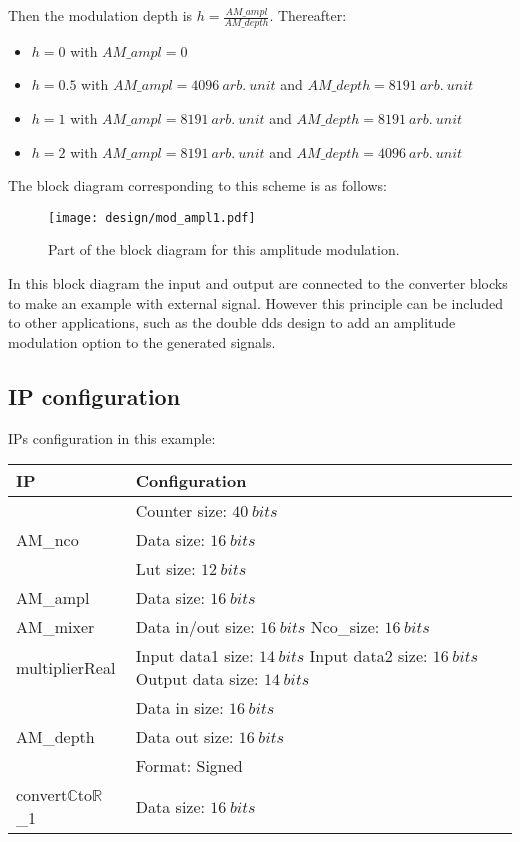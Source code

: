 \documentclass[12pt,oneside]{article}
\begin{document}
Then the modulation depth is $h=\frac{AM\_ampl}{AM\_depth}$. Thereafter:
\vspace{-0.1cm}
\begin{itemize}
	\setlength\itemsep{-0.2cm}
	\item $h=0$ with $AM\_ampl=0$ 
	\item $h=0.5$ with $AM\_ampl=4096~arb.~unit$ and $AM\_depth=8191~arb.~unit$
	\item $h=1$ with $AM\_ampl=8191~arb.~unit$ and $AM\_depth=8191~arb.~unit$
	\item $h=2$ with $AM\_ampl=8191~arb.~unit$ and $AM\_depth=4096~arb.~unit$
\end{itemize}The block diagram corresponding to this scheme is as follows:\newpage

\begin{figure}[h!tb]
	\begin{center}
		\texttt{[image: design/mod\_ampl1.pdf]}
		\caption{Part of the block diagram for this amplitude modulation.}
		\label{fig:mod_ampl1}
	\end{center}
\end{figure}

In this block diagram the input and output are connected to the converter blocks to make an example with external signal. However this principle can be included to other applications, such as the double dds design to add an amplitude modulation option to the generated signals.
\vspace{-0.3cm}
\subsection{IP configuration}
\vspace{-0cm}
IPs configuration in this example:
\begin{center}
	\begin{tabular}{|>{\centering\arraybackslash}m{.3\linewidth} | >{\centering\arraybackslash}m{.3\linewidth} |}
		\hline
		IP & Configuration \\
		\hline
		& Counter size: $40~bits$\\ AM\_nco &Data size: $16~bits$\\ &Lut size: $12~bits$ \\
		\hline
		AM\_ampl&Data size: $16~bits$ \\
		\hline
		AM\_mixer&Data in/out size: $16~bits$ \newline Nco\_size: $16~bits$ \\
		\hdashline
		multiplierReal&Input data1 size: $14~bits$ \newline Input data2 size: $16~bits$\newline Output data size: $14~bits$ \\
		\hline
		& Data in size: $16~bits$\\AM\_depth & Data out size: $16~bits$\\ &Format: Signed \\
		\hline
		convert$\mathbb{C}$to$\mathbb{R}$\_1&Data size: $16~bits$\\
		\hline
	\end{tabular}
\end{center}
\vspace{-0.2cm}
\end{document}
